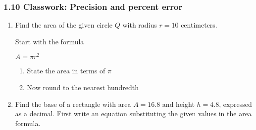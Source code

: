 

\fancyhead[LE]{\thepage}



\subsubsection*{1.10 Classwork: Precision and percent error} 
\begin{enumerate}

\item Find the area of the given circle $Q$ with radius $r=10$ centimeters.
  \begin{multicols}{2}
  \raggedcolumns
  Start with the formula \par \medskip
  $A = \pi r^2$ 
  \begin{enumerate}
    \item State the area in terms of $\pi$ \vspace{1.7cm}
    \item Now round to the nearest hundredth
  \end{enumerate}
  \end{multicols}

\item Find the base of a rectangle with area $A=16.8$ and height $h=4.8$, expressed as a decimal. First write an equation substituting the given values in the area formula.
  \begin{flushright}
  \end{flushright}


\end{enumerate}
